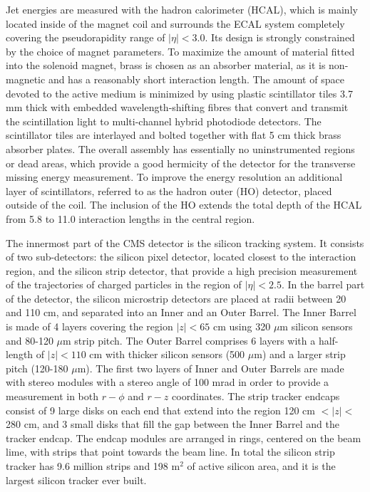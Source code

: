 Jet energies are measured with the hadron calorimeter (HCAL), which
is mainly located inside of the magnet coil and surrounds 
the ECAL system completely covering the pseudorapidity range of $|\eta| < 3.0$.
Its design is strongly constrained by the choice of magnet parameters. 
To maximize the amount of material fitted into the solenoid magnet, 
brass is chosen as an absorber material, as it is non-magnetic and has a reasonably short interaction length.
The amount of space devoted to the active medium is minimized
by using plastic scintillator tiles 3.7 mm thick 
with embedded wavelength-shifting fibres that convert and transmit 
the scintillation light to multi-channel hybrid photodiode detectors. 
The scintillator tiles are interlayed and bolted together with flat 5 cm thick brass absorber plates.
The overall assembly has essentially no uninstrumented regions or dead areas, which provide 
a good hermicity of the detector for the transverse missing energy measurement.
To improve the energy resolution an additional layer of scintillators, referred to as the 
hadron outer (HO) detector, placed outside of the coil.
The inclusion of the HO extends the total depth of the HCAL from 5.8 to 11.0 interaction lengths
in the central region.
 
 The innermost part of the CMS detector is the silicon tracking system. 
 It consists of two sub-detectors: the silicon pixel detector, located closest to the interaction 
 region, and the silicon strip detector, that provide a high precision measurement of the trajectories
 of charged particles in the region of $|\eta| < 2.5$.
 In the barrel part of the detector, the silicon microstrip detectors are placed 
 at radii between 20 and 110 cm, and separated into an Inner and an Outer Barrel. 
 The Inner Barrel is made of 4 layers covering the region $|z| < 65$ cm
 using 320 $\mu$m silicon sensors and 80-120 $\mu$m strip pitch.
 The Outer Barrel comprises 6 layers with a half-length of $|z| < 110$ cm
 with thicker silicon sensors (500 $\mu$m) and a larger strip pitch (120-180 $\mu$m).
 The first two layers of Inner and Outer Barrels 
 are made with stereo modules with a stereo angle of 100 mrad in order to provide 
 a measurement in both $r-\phi$ and $r-z$ coordinates.
 The strip tracker endcaps consist of 9 large disks on each end
 that extend into the region 120 cm $ < |z| < $ 280 cm, and 
 3 small disks that fill the gap between the Inner Barrel and the tracker endcap.
 The endcap modules are arranged in rings, centered on the beam lime, with strips 
 that point towards the beam line. 
  In total the silicon strip tracker has 9.6 million strips and 198 m$^2$
of active silicon area, and it is the largest silicon tracker ever built.


